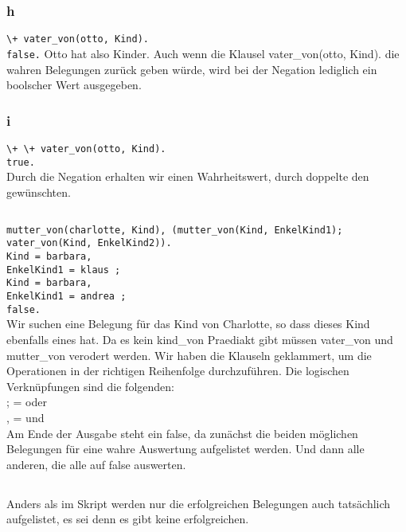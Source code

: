 \documentclass[11pt]{article}
\begin{document}
\subsubsection*{h}
\verb|\+ vater_von(otto, Kind).|\\
\verb|false.|
Otto hat also Kinder.
Auch wenn die Klausel vater\_von(otto, Kind). die wahren Belegungen
zurück geben würde, wird bei der Negation lediglich ein boolscher Wert ausgegeben.

\subsubsection*{i}
\verb|\+ \+ vater_von(otto, Kind).|\\
\verb|true.|\\
Durch die Negation erhalten wir einen Wahrheitswert,
durch doppelte den gewünschten.

\subsection{}

\verb|mutter_von(charlotte, Kind), (mutter_von(Kind, EnkelKind1);| \verb|vater_von(Kind, EnkelKind2)).|\\
\verb|Kind = barbara,|\\
\verb|EnkelKind1 = klaus ;|\\
\verb|Kind = barbara,|\\
\verb|EnkelKind1 = andrea ;|\\
\verb|false.|\\

Wir suchen eine Belegung für das Kind von Charlotte, so dass dieses Kind ebenfalls eines hat.
Da es kein kind\_von Praediakt gibt müssen vater\_von und mutter\_von verodert werden.
Wir haben die Klauseln geklammert, um die Operationen in der richtigen Reihenfolge durchzuführen.
Die logischen Verknüpfungen sind die folgenden:\\
; = oder\\
, = und\\

Am Ende der Ausgabe steht ein false, da zunächst die beiden möglichen Belegungen für eine wahre
Auswertung aufgelistet werden. Und dann alle anderen, die alle auf false auswerten.

\subsection{}

Anders als im Skript werden nur die erfolgreichen Belegungen auch tatsächlich aufgelistet,
es sei denn es gibt keine erfolgreichen.
\end{document}
